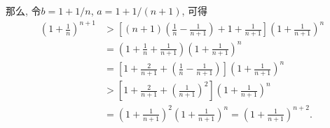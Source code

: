 \documentclass[serif]{beamer}
\begin{document}
\begin{frame}
	那么, 令$b=1+1/n$, $a=1+1/(n+1)$, 可得
	\begin{align*}
		\left(1+\frac{1}{n}\right)^{n+1}&>\left[(n+1)\left(\frac{1}{n}-\frac{1}{n+1}\right)+1+\frac{1}{n+1}\right]\left(1+\frac{1}{n+1}\right)^n\\
		&=\left(1+\frac{1}{n}+\frac{1}{n+1}\right)\left(1+\frac{1}{n+1}\right)^n\\
		&=\left[1+\frac{2}{n+1}+\left(\frac{1}{n}-\frac{1}{n+1}\right)\right]\left(1+\frac{1}{n+1}\right)^n\\
		&>\left[1+\frac{2}{n+1}+\left(\frac{1}{n+1}\right)^2\right]\left(1+\frac{1}{n+1}\right)^n\\
		&=\left(1+\frac{1}{n+1}\right)^2\left(1+\frac{1}{n+1}\right)^n=\left(1+\frac{1}{n+1}\right)^{n+2}.
	\end{align*}
\end{frame}
\end{document}
